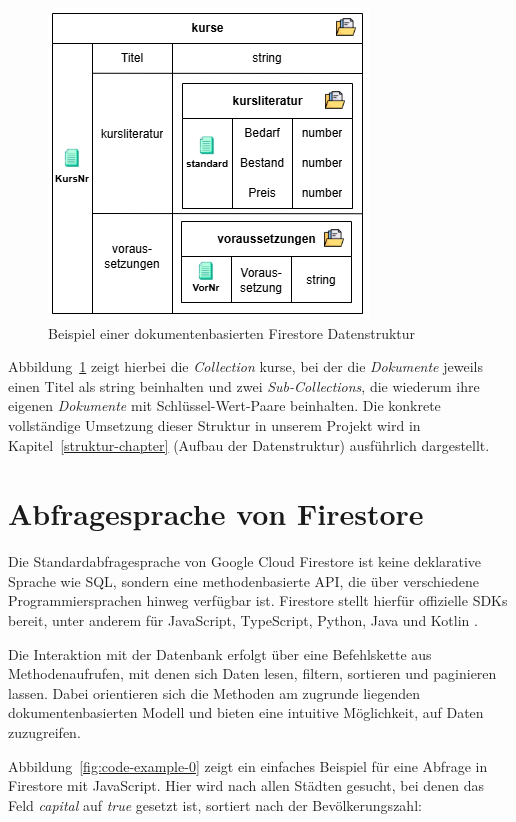 \documentclass[12pt,a4paper%
              ,oneside     %
              ,titlepage
              ,DIV=13
              ,headinclude
              ,footinclude=false%
              ,cleardoublepage=empty%
              ,parskip=half,
              BCOR=0mm,
              ]{scrreprt}
\begin{document}
\begin{figure}[H]
	\centering
	\includegraphics{img/struktur_ausschnitt.png}
	\caption{Beispiel einer dokumentenbasierten Firestore Datenstruktur}
	\label{fig:struktur-example}
\end{figure}

Abbildung~\ref{fig:struktur-example} zeigt hierbei die \textit{Collection} kurse, bei der die \textit{Dokumente} jeweils einen Titel als string beinhalten und zwei \textit{Sub-Collections}, die wiederum ihre eigenen \textit{Dokumente} mit Schlüssel-Wert-Paare beinhalten. Die konkrete vollständige Umsetzung dieser Struktur in unserem Projekt wird in Kapitel~\ref{struktur-chapter} (\glqq Aufbau der Datenstruktur\grqq{}) ausführlich dargestellt.

\section{Abfragesprache von Firestore}
\label{sprache-firestore}

Die Standardabfragesprache von Google Cloud Firestore ist keine deklarative Sprache wie SQL, sondern eine methodenbasierte API, die über verschiedene Programmiersprachen hinweg verfügbar ist. Firestore stellt hierfür offizielle SDKs bereit, unter anderem für JavaScript, TypeScript, Python, Java und Kotlin \cite{GoogleCloudQueries.2025}.

Die Interaktion mit der Datenbank erfolgt über eine Befehlskette aus Methodenaufrufen, mit denen sich Daten lesen, filtern, sortieren und paginieren lassen. Dabei orientieren sich die Methoden am zugrunde liegenden dokumentenbasierten Modell und bieten eine intuitive Möglichkeit, auf Daten zuzugreifen.

Abbildung~\ref{fig:code-example-0} zeigt ein einfaches Beispiel für eine Abfrage in Firestore mit JavaScript. Hier wird nach allen Städten gesucht, bei denen das Feld \textit{capital} auf \textit{true} gesetzt ist, sortiert nach der Bevölkerungszahl:
\end{document}
